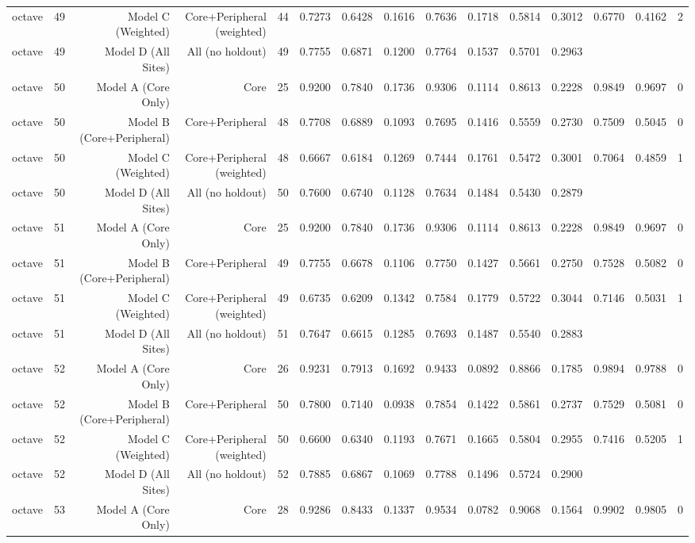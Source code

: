 {\begin{longtable}{lrrrrrrrrrrrrrr}
  octave & 49 & Model C (Weighted) & Core+Peripheral (weighted) & 44 & 0.7273 & 0.6428 & 0.1616 & 0.7636 & 0.1718 & 0.5814 & 0.3012 & 0.6770 & 0.4162 & 2 \\
  octave & 49 & Model D (All Sites) & All (no holdout) & 49 & 0.7755 & 0.6871 & 0.1200 & 0.7764 & 0.1537 & 0.5701 & 0.2963 &  &  &  \\
  octave & 50 & Model A (Core Only) & Core & 25 & 0.9200 & 0.7840 & 0.1736 & 0.9306 & 0.1114 & 0.8613 & 0.2228 & 0.9849 & 0.9697 & 0 \\
  octave & 50 & Model B (Core+Peripheral) & Core+Peripheral & 48 & 0.7708 & 0.6889 & 0.1093 & 0.7695 & 0.1416 & 0.5559 & 0.2730 & 0.7509 & 0.5045 & 0 \\
  octave & 50 & Model C (Weighted) & Core+Peripheral (weighted) & 48 & 0.6667 & 0.6184 & 0.1269 & 0.7444 & 0.1761 & 0.5472 & 0.3001 & 0.7064 & 0.4859 & 1 \\
  octave & 50 & Model D (All Sites) & All (no holdout) & 50 & 0.7600 & 0.6740 & 0.1128 & 0.7634 & 0.1484 & 0.5430 & 0.2879 &  &  &  \\
  octave & 51 & Model A (Core Only) & Core & 25 & 0.9200 & 0.7840 & 0.1736 & 0.9306 & 0.1114 & 0.8613 & 0.2228 & 0.9849 & 0.9697 & 0 \\
  octave & 51 & Model B (Core+Peripheral) & Core+Peripheral & 49 & 0.7755 & 0.6678 & 0.1106 & 0.7750 & 0.1427 & 0.5661 & 0.2750 & 0.7528 & 0.5082 & 0 \\
  octave & 51 & Model C (Weighted) & Core+Peripheral (weighted) & 49 & 0.6735 & 0.6209 & 0.1342 & 0.7584 & 0.1779 & 0.5722 & 0.3044 & 0.7146 & 0.5031 & 1 \\
  octave & 51 & Model D (All Sites) & All (no holdout) & 51 & 0.7647 & 0.6615 & 0.1285 & 0.7693 & 0.1487 & 0.5540 & 0.2883 &  &  &  \\
  octave & 52 & Model A (Core Only) & Core & 26 & 0.9231 & 0.7913 & 0.1692 & 0.9433 & 0.0892 & 0.8866 & 0.1785 & 0.9894 & 0.9788 & 0 \\
  octave & 52 & Model B (Core+Peripheral) & Core+Peripheral & 50 & 0.7800 & 0.7140 & 0.0938 & 0.7854 & 0.1422 & 0.5861 & 0.2737 & 0.7529 & 0.5081 & 0 \\
  octave & 52 & Model C (Weighted) & Core+Peripheral (weighted) & 50 & 0.6600 & 0.6340 & 0.1193 & 0.7671 & 0.1665 & 0.5804 & 0.2955 & 0.7416 & 0.5205 & 1 \\
  octave & 52 & Model D (All Sites) & All (no holdout) & 52 & 0.7885 & 0.6867 & 0.1069 & 0.7788 & 0.1496 & 0.5724 & 0.2900 &  &  &  \\
  octave & 53 & Model A (Core Only) & Core & 28 & 0.9286 & 0.8433 & 0.1337 & 0.9534 & 0.0782 & 0.9068 & 0.1564 & 0.9902 & 0.9805 & 0 \\

\end{longtable}}
